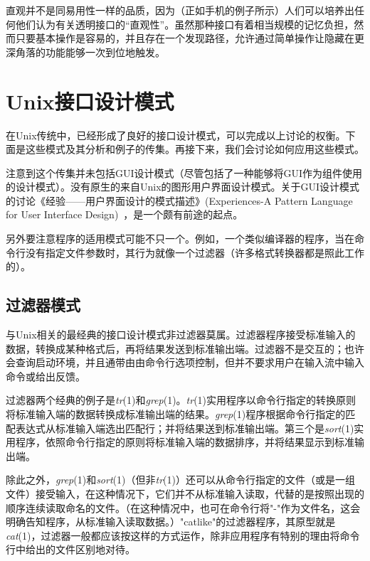 \documentclass[12pt,oneside]{ctexbook}
\begin{document}
\begin{common-format}
直观并不是同易用性一样的品质，因为（正如手机的例子所示）人们可以培养出任何他们认为有关透明接口的“直观性”。虽然那种接口有着相当规模的记忆负担，然而只要基本操作是容易的，并且存在一个发现路径，允许通过简单操作让隐藏在更深角落的功能能够一次到位地触发。

\section{Unix接口设计模式}
在Unix传统中，已经形成了良好的接口设计模式，可以完成以上讨论的权衡。下面是这些模式及其分析和例子的传集。再接下来，我们会讨论如何应用这些模式。

注意到这个传集并未包括GUI设计模式（尽管包括了一种能够将GUI作为组件使用的设计模式）。没有原生的来自Unix的图形用户界面设计模式。关于GUI设计模式的讨论《经验——用户界面设计的模式描述》(Experiences-A Pattern Language for User Interface Design)~\cite{Coram-Lee}，是一个颇有前途的起点。

另外要注意程序的适用模式可能不只一个。例如，一个类似编译器的程序，当在命令行没有指定文件参数时，其行为就像一个过滤器（许多格式转换器都是照此工作的）。

\subsection{过滤器模式}
与Unix相关的最经典的接口设计模式非过滤器莫属。过滤器程序接受标准输入的数据，转换成某种格式后，再将结果发送到标准输出端。过滤器不是交互的；也许会查询启动环境，并且通带由由命令行选项控制，但并不要求用户在输入流中输入命令或给出反馈。

过滤器两个经典的例子是\textit{tr}(1)和\textit{grep}(1)。\textit{tr}(1)实用程序以命令行指定的转换原则将标准输入端的数据转换成标准输出端的结果。\textit{grep}(1)程序根据命令行指定的匹配表达式从标准输入端选出匹配行；并将结果送到标准输出端。第三个是\textit{sort}(1)实用程序，依照命令行指定的原则将标准输入端的数据排序，并将结果显示到标准输出端。

除此之外，\textit{grep}(1)和\textit{sort}(1)（但非\textit{tr}(1)）还可以从命令行指定的文件（或是一组文件）接受输入，在这种情况下，它们并不从标准输入读取，代替的是按照出现的顺序连续读取命名的文件。（在这种情况中，也可在命令行将"-"作为文件名，这会明确告知程序，从标准输入读取数据。）"catlike"的过滤器程序，其原型就是\textit{cat}(1)，过滤器一般都应该按这样的方式运作，除非应用程序有特别的理由将命令行中给出的文件区别地对待。


\end{common-format}
\end{document}
